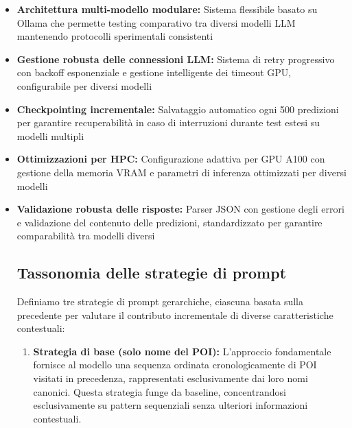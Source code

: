 \begin{itemize}
\item \textbf{Architettura multi-modello modulare:} Sistema flessibile basato su Ollama che permette testing comparativo tra diversi modelli LLM mantenendo protocolli sperimentali consistenti
\item \textbf{Gestione robusta delle connessioni LLM:} Sistema di retry progressivo con backoff esponenziale e gestione intelligente dei timeout GPU, configurabile per diversi modelli
\item \textbf{Checkpointing incrementale:} Salvataggio automatico ogni 500 predizioni per garantire recuperabilità in caso di interruzioni durante test estesi su modelli multipli
\item \textbf{Ottimizzazioni per HPC:} Configurazione adattiva per GPU A100 con gestione della memoria VRAM e parametri di inferenza ottimizzati per diversi modelli
\item \textbf{Validazione robusta delle risposte:} Parser JSON con gestione degli errori e validazione del contenuto delle predizioni, standardizzato per garantire comparabilità tra modelli diversi

\subsection{Tassonomia delle strategie di prompt}

Definiamo tre strategie di prompt gerarchiche, ciascuna basata sulla precedente per valutare il contributo incrementale di diverse caratteristiche contestuali:

\begin{enumerate}

\item \textbf{Strategia di base (solo nome del POI):} L'approccio fondamentale fornisce al modello una sequenza ordinata cronologicamente di POI visitati in precedenza, rappresentati esclusivamente dai loro nomi canonici. Questa strategia funge da baseline, concentrandosi esclusivamente su pattern sequenziali senza ulteriori informazioni contestuali.


\end{enumerate}
\end{itemize}
